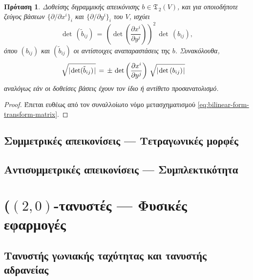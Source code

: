 \documentclass[11pt,a4paper,twoside,openright]{book}
\newtheorem{proposition}[lemma]{Πρόταση}
\begin{document}
\begin{proposition}%
	\label{prop:dilation-coefficient}
Δοθείσης διγραμμικής απεικόνισης $b \in \mathfrak{T}_{\,2}(V)$,
και για οποιοδήποτε ζεύγος βάσεων $\{\partial/\partial x^i\}_i$
και $\{\partial/\partial y^i\}_i$ του $V$, ισχύει
\begin{equation}\label{eq:dilation-coefficient-quadratic}
\det\,(\tilde{b}_{ij})
\,
=
\,
\left(\det\left(\frac{\partial x^i}{\partial y^j}\right)\right)^2
\,
\det\,(b_{ij}),
\end{equation}
όπου $(b_{ij})$ και
$(\tilde{b}_{ij})$
οι αντίστοιχες αναπαραστάσεις της $b$. Συνακόλουθα,
\begin{equation}\label{eq:dilation-coefficient-absolute}
\hspace{-10pt}
\sqrt{\lvert\hspace{.75pt} \det (\tilde{b}_{ij}) \hspace{.75pt}\rvert}
\,
=
\,
\pm
\,
\det \left( \frac{\partial x^i}{\partial y^j} \right)
\,
\sqrt{\lvert\hspace{.75pt} \det \left(b_{ij}\right) \hspace{.75pt}\rvert}
\end{equation}
αναλόγως εάν οι δοθείσες βάσεις έχουν τον ίδιο ή αντίθετο προσανατολισμό.
\end{proposition}
\begin{proof}
Έπεται ευθέως από τον συναλλοίωτο νόμο μετασχηματισμού
\eqref{eq:bilinear-form-transform-matrix}.
\end{proof}

\subsection{Συμμετρικές απεικονίσεις --- Τετραγωνικές μορφές}
	\label{sec:symmetric-2-tensors}
	
\subsection{Αντισυμμετρικές απεικονίσεις --- Συμπλεκτικότητα}
	\label{sec:antisymmetric-2-tensors}
	
\section{($(2,0)$-τανυστές --- Φυσικές εφαρμογές}
	\label{2-tensors-applications}

\subsection{Τανυστής γωνιακής ταχύτητας και τανυστής αδρανείας}
\end{document}
